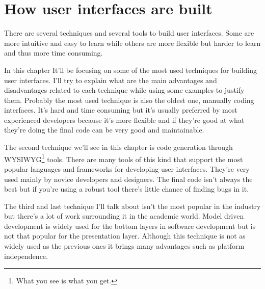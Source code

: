 \section{How user interfaces are built}
There are several techniques and several tools to build user interfaces. Some are more intuitive and easy to learn while others are more flexible but harder to learn and thus more time consuming.

In this chapter It'll be focusing on some of the most used techniques for building user interfaces. I'll try to explain what are the main advantages and disadvantages related to each technique while using some examples to justify them.
Probably the most used technique is also the oldest one, manually coding interfaces. It's hard and time consuming but it's usually preferred by most experienced developers because it's more flexible and if they're good at what they're doing the final code can be very good and maintainable.

The second technique we'll see in this chapter is code generation through WYSIWYG\footnote{What you see is what you get.} tools. There are many tools of this kind that support the most popular languages and frameworks for developing user interfaces. They're very used mainly by novice developers and designers. The final code isn't always the best but if you're using a robust tool there's little chance of finding bugs in it.

The third and last technique I'll talk about isn't the most popular in the industry but there's a lot of work surrounding it in the academic world. Model driven development is widely used for the bottom layers in software development but is not that popular for the presentation layer. Although this technique is not as widely used as the previous ones it brings many advantages such as platform independence.



